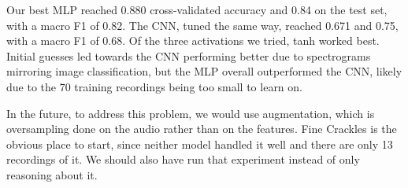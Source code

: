 \documentclass[conference]{IEEEtran}
\begin{document}
Our best MLP reached 0.880 cross-validated accuracy and 0.84 on the test set,
with a macro F1 of 0.82. The CNN, tuned the same way, reached 0.671 and 0.75,
with a macro F1 of 0.68. Of the three activations we tried, tanh worked best.
Initial guesses led towards the CNN performing better due to spectrograms
mirroring image classification, but the MLP overall outperformed the CNN, likely
due to the 70 training recordings being too small to learn on.

In the future, to address this problem, we would use augmentation, which is
oversampling done on the audio rather than on the features. Fine Crackles is the
obvious place to start, since neither model handled it well and there are only 13
recordings of it. We should also have run that experiment instead of only
reasoning about it.
\end{document}

